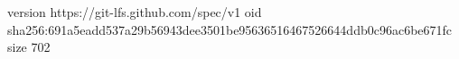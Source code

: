version https://git-lfs.github.com/spec/v1
oid sha256:691a5eadd537a29b56943dee3501be95636516467526644ddb0c96ac6be671fc
size 702
